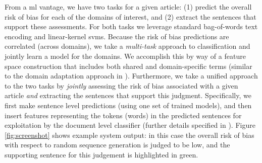 \documentclass[runningheads,a4paper]{llncs}
\begin{document}
From a \ac{ml} vantage, we have two tasks for a given article: (1) predict the overall risk of bias for each of the domains of interest, and (2) extract the sentences that support these assessments.
For both tasks we leverage standard bag-of-words text encoding and linear-kernel \acp{svm}.
Because the risk of bias predictions are correlated (across domains), we take a \emph{multi-task} \cite{evgeniou2004} approach to classification and jointly learn a model for the domains.
We accomplish this by way of a feature space construction that includes both shared and domain-specific terms (similar to the domain adaptation approach in \cite{daume2007}).
Furthermore, we take a unified approach to the two tasks by \emph{jointly} assessing the risk of bias associated with a given article \emph{and} extracting the sentences that support this judgment.
Specifically, we first make sentence level predictions (using one set of trained models), and then insert features representing the tokens (words) in the predicted sentences for exploitation by the document level classifier (further details specified in \cite{marshall2014}).
Figure \ref{fig:screenshot} shows example system output: in this case the overall risk of bias with respect to random sequence generation is judged to be low, and the supporting sentence for this judgement is highlighted in green.


\end{document}
